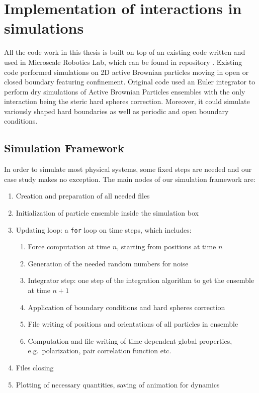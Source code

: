 \documentclass[../../master_thesis_np.tex]{subfiles}
\begin{document}
\chapter[Interaction Implementation]{Implementation of interactions in simulations}
\label{chap:int_impl}

	All the code work in this thesis is built on top of an existing code written and used in Microscale Robotics Lab, which can be found in repository \cite{sharma_simulations_2023}.
    Existing code performed simulations on 2D active Brownian particles moving in open or closed boundary featuring confinement. 
	Original code used an Euler integrator to perform dry simulations of Active Brownian Particles ensembles with the only interaction being the steric hard spheres correction. 
	Moreover, it could simulate variously shaped hard boundaries as well as periodic and open boundary conditions.
	
	\section{Simulation Framework}
	In order to simulate most physical systems, some fixed steps are needed and our case study makes no exception. 
	The main nodes of our simulation framework are:
	\begin{enumerate}
		\item Creation and preparation of all needed files
		\item Initialization of particle ensemble inside the simulation box
		\item Updating loop: a \verb|for| loop on time steps, which includes:
		\begin{enumerate}
			\item Force computation at time $n$, starting from positions at time $n$
			\item Generation of the needed random numbers for noise
			\item Integrator step: one step of the integration algorithm to get the ensemble at time $n+1$
			\item Application of boundary conditions and hard spheres correction 
			\item File writing of positions and orientations of all particles in ensemble %
			\item Computation and file writing of time-dependent global properties, e.g.\ polarization, pair correlation function etc.	%
		\end{enumerate}
		\item Files closing
		\item Plotting of necessary quantities, saving of animation for dynamics
	\end{enumerate}
	
\end{document}
